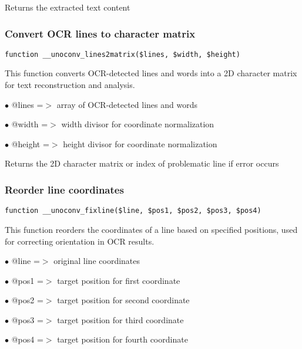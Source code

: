 \documentclass[a4paper]{article}
\begin{document}
Returns the extracted text content

\hypertarget{toc547}{}
\subsubsection{Convert OCR lines to character matrix}

\begin{lstlisting}
function __unoconv_lines2matrix($lines, $width, $height)
\end{lstlisting}

This function converts OCR-detected lines and words into a 2D character matrix
for text reconstruction and analysis.

\begin{compactitem}
\item[\color{myblue}$\bullet$] @lines  =$>$ array of OCR-detected lines and words
\item[\color{myblue}$\bullet$] @width  =$>$ width divisor for coordinate normalization
\item[\color{myblue}$\bullet$] @height =$>$ height divisor for coordinate normalization
\end{compactitem}

Returns the 2D character matrix or index of problematic line if error occurs

\hypertarget{toc548}{}
\subsubsection{Reorder line coordinates}

\begin{lstlisting}
function __unoconv_fixline($line, $pos1, $pos2, $pos3, $pos4)
\end{lstlisting}

This function reorders the coordinates of a line based on specified positions,
used for correcting orientation in OCR results.

\begin{compactitem}
\item[\color{myblue}$\bullet$] @line =$>$ original line coordinates
\item[\color{myblue}$\bullet$] @pos1 =$>$ target position for first coordinate
\item[\color{myblue}$\bullet$] @pos2 =$>$ target position for second coordinate
\item[\color{myblue}$\bullet$] @pos3 =$>$ target position for third coordinate
\item[\color{myblue}$\bullet$] @pos4 =$>$ target position for fourth coordinate
\end{compactitem}
\end{document}
